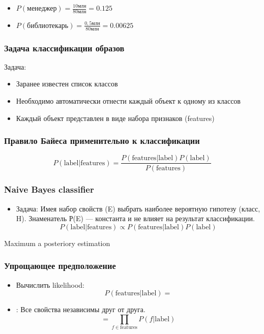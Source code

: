 \documentclass[svgnames]{beamer}
\begin{document}
\begin{frame}[standout]
  \begin{itemize}
  \item $P(\text{менеджер}) = \frac{10 \text{млн}}{80 \text{млн}} = 0.125$
  \item $P(\text{библиотекарь}) = \frac{0,5 \text{млн}}{80
      \text{млн}} = 0.00625$
  \end{itemize}
\end{frame}

\begin{frame}
  \frametitle{Задача классификации образов}
  Задача:
  \begin{itemize}
  \item Заранее известен список \alert{классов}
  \item Необходимо автоматически отнести каждый объект к одному из
    классов
  \item Каждый объект представлен в виде набора признаков (features)
  \end{itemize}
\end{frame}

\begin{frame}
  \frametitle{Правило Байеса применительно к классификации}
\begin{equation}
    P(\text{label}|\text{features}) = \frac{P(\text{features}|\text{label})P(\text{label})}{P(\text{features})}
  \end{equation}
\end{frame}

\begin{frame}
  \frametitle{Naive Bayes classifier}
  \begin{itemize}
  \item Задача:  Имея набор свойств (E) выбрать наиболее вероятную гипотезу
    (класс, H). Знаменатель Р(E) — константа и не влияет на результат классификации.
  $$
   P(\text{label}|\text{features}) \propto P(\text{features}|\text{label}) P(\text{label})
   $$
   \end{itemize}
   \alert{Maximum a posteriory estimation}
\end{frame}

\begin{frame}
  \frametitle{Упрощающее предположение}
\begin{itemize}
 \item Вычислить likelihood:
   $$
   P(\text{features}|\text{label}) = 
   $$
 \item {}: Все свойства независимы друг от друга.
   $$
   = \prod_{f \in \text{features}} P(f|\text{label})
   $$
 \end{itemize}
\end{frame}
\end{document}
